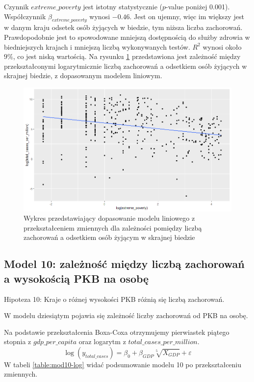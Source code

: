 \documentclass[12pt]{mwbk}
\theoremstyle{plain}
\theoremstyle{definition}
\theoremstyle{remark}
\newcommand\zrodlo[1]{\par\vspace{-3mm}{\small\textit{Źródło: }#1 }}
\begin{document}
Czynnik $extreme\_poverty$ jest istotny statystycznie ($p$-value poniżej 0.001). \\Współczynnik $\beta_{extreme\_poverty}$ wynosi $-0.46$. Jest on ujemny, więc im większy jest w danym kraju odsetek osób żyjących w biedzie, tym niższa liczba zachorowań. Prawdopodobnie jest to spowodowane mniejszą dostępnością do służby zdrowia w biedniejszych krajach i mniejszą liczbą wykonywanych testów. $R^2$ wynosi około $9\%$, co jest niską wartością. Na rysunku \ref{fig:mod9-log} przedstawiona jest zależność między przekształconymi logarytmicznie liczbą zachorowań a odsetkiem osób żyjących w skrajnej biedzie, z dopasowanym modelem liniowym. 
\newpage
\begin{figure}[!ht]
	\centering
	\includegraphics[width=\linewidth]{rys/mod9-log.png}
	\caption{Wykres przedstawiający dopasowanie modelu liniowego z przekształceniem zmiennych dla zależności pomiędzy liczbą zachorowań a odsetkiem osób żyjącym w skrajnej biedzie}
	\label{fig:mod9-log}
	\zrodlo{Opracowanie własne}
\end{figure}



\subsection{Model 10: zależność między liczbą zachorowań a wysokością PKB na osobę}

Hipoteza 10: Kraje o różnej wysokości PKB różnią się liczbą zachorowań.


W modelu dziesiątym pojawia się zależność liczby zachorowań od PKB na osobę.


Na podstawie przekształcenia Boxa-Coxa otrzymujemy pierwiastek piątego stopnia z $gdp\_per\_capita$ oraz logarytm z $total\_cases\_per\_million$.
$$\log(y_{total\_cases})=\beta_0+\beta_{GDP}\sqrt[5]{X_{GDP}}+\varepsilon$$
W tabeli \ref{table:mod10-log} widać podsumowanie modelu 10 po przekształceniu zmiennych.
\end{document}
